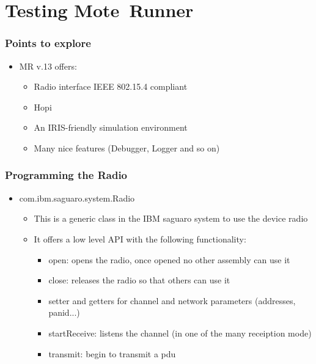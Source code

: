 \section{Testing \mbox{Mote Runner}}
\begin{frame}[fragile]
  \frametitle{Points to explore}
  \begin{itemize}
    \item MR v.13 offers:
    \begin{itemize}
    	\item Radio interface IEEE 802.15.4 compliant
    	\item Hopi
    	\item An IRIS-friendly simulation environment
    	\item Many nice features (Debugger, Logger and so on)
    \end{itemize}
  \end{itemize}
\end{frame}

\begin{frame}[fragile]
  \frametitle{Programming the Radio}
  \begin{itemize}
    \item com.ibm.saguaro.system.Radio
    \begin{itemize}
    	\item This is a generic class in the IBM saguaro system to use the device radio
    	\item It offers a low level API with the following functionality:
    	\begin{itemize}
	  \item open: opens the radio, once opened no other assembly can use it
	  \item close: releases the radio so that others can use it
	  \item setter and getters for channel and network parameters (addresses, panid...)
	  \item startReceive: listens the channel (in one of the many receiption mode)
	  \item transmit: begin to transmit a pdu
    	\end{itemize}
    \end{itemize}
  \end{itemize}
\end{frame}

